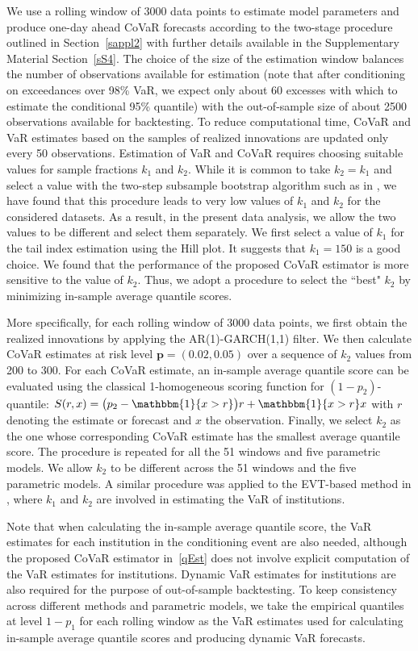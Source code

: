 \documentclass[11pt,letterpaper]{article}
\def\pb{{\mathbf p}}
\def\ind{{\mathbbm{1}}}
\numberwithin{equation}{section}
\begin{document}
We use a rolling window of 3000 data points to estimate model parameters and produce one-day ahead CoVaR forecasts according to the two-stage procedure outlined in Section~\ref{sappl2} with further details available in the Supplementary Material Section~\ref{sS4}. The choice of the size of the estimation window balances the number of observations available for estimation (note that after conditioning on exceedances over 98\% VaR, we expect only about 60 excesses with which to estimate the conditional 95\% quantile) with the out-of-sample size of about 2500 observations available for backtesting. To reduce computational time, CoVaR and VaR estimates based on the samples of realized innovations are updated only every 50 observations. Estimation of VaR and CoVaR requires choosing suitable values for sample fractions $k_1$ and $k_2$. While it is common to take $k_2 = k_1$ and select a value with the two-step subsample bootstrap algorithm such as in \citet{Danielsson_etal2001}, we have found that this procedure leads to very low values of $k_1$ and $k_2$ for the considered datasets. As a result, in the present data analysis, we allow the two values to be different and select them separately. We first select a value of $k_1$ for the tail index estimation using the Hill plot. It suggests that $k_1 = 150$ is a good choice. We found that the performance of the proposed CoVaR estimator is more sensitive to the value of $k_2$. Thus, we adopt a procedure to select the ``best" $k_2$ by minimizing in-sample average quantile scores.

More specifically, for each rolling window of 3000 data points, we first obtain the realized innovations by applying the AR(1)-GARCH(1,1) filter. We then calculate CoVaR estimates at risk level $\pb = (0.02,0.05)$ over a sequence of $k_2$ values from 200 to 300. For each CoVaR estimate, an in-sample average quantile score can be evaluated using the classical 1-homogeneous scoring function for $(1-p_2)$-quantile: $S(r,x) = \bigl(p_2 - \ind\{x>r\}\bigr)r + \ind\{x>r\}x$ with $r$ denoting the estimate or forecast and $x$ the observation. Finally, we select $k_2$ as the one whose corresponding CoVaR estimate has the smallest average quantile score. The procedure is repeated for all the 51 windows and five parametric models. We allow $k_2$ to be different across the 51 windows and the five parametric models. A similar procedure was applied to the EVT-based method in \cite{NoldeZhang2018}, where $k_1$ and $k_2$ are involved in estimating the VaR of institutions. 

Note that when calculating the in-sample average quantile score, the VaR estimates for each institution in the conditioning event are also needed, although the proposed CoVaR estimator in~\eqref{qEst} does not involve explicit computation of the VaR estimates for institutions. Dynamic VaR estimates for institutions are also required for the purpose of out-of-sample backtesting. To keep consistency across different methods and parametric models, we take the empirical quantiles at level $1-p_1$ for each rolling window as the VaR estimates used for calculating in-sample average quantile scores and producing dynamic VaR forecasts.
\end{document}
